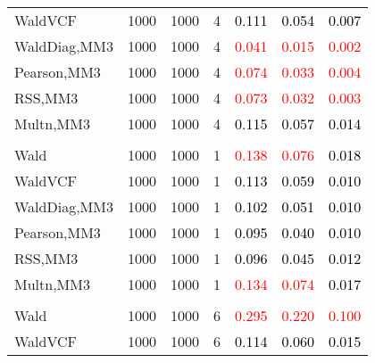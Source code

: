\documentclass[
]{article}
\begin{document}
\begin{table}[H]
{\begin{tabular}[t]{lrrrrrr}
\hspace{1em}WaldVCF & 1000 & 1000 & 4 & \textcolor{black}{0.111} & \textcolor{black}{0.054} & \textcolor{black}{0.007}\\
\hspace{1em}WaldDiag,MM3 & 1000 & 1000 & 4 & \textcolor{red}{0.041} & \textcolor{red}{0.015} & \textcolor{red}{0.002}\\
\hspace{1em}Pearson,MM3 & 1000 & 1000 & 4 & \textcolor{red}{0.074} & \textcolor{red}{0.033} & \textcolor{red}{0.004}\\
\hspace{1em}RSS,MM3 & 1000 & 1000 & 4 & \textcolor{red}{0.073} & \textcolor{red}{0.032} & \textcolor{red}{0.003}\\
\hspace{1em}Multn,MM3 & 1000 & 1000 & 4 & \textcolor{black}{0.115} & \textcolor{black}{0.057} & \textcolor{black}{0.014}\\
\addlinespace[0.3em]
\multicolumn{7}{l}{\textbf{1F 15V}}\\
\hspace{1em}Wald & 1000 & 1000 & 1 & \textcolor{red}{0.138} & \textcolor{red}{0.076} & \textcolor{black}{0.018}\\
\hspace{1em}WaldVCF & 1000 & 1000 & 1 & \textcolor{black}{0.113} & \textcolor{black}{0.059} & \textcolor{black}{0.010}\\
\hspace{1em}WaldDiag,MM3 & 1000 & 1000 & 1 & \textcolor{black}{0.102} & \textcolor{black}{0.051} & \textcolor{black}{0.010}\\
\hspace{1em}Pearson,MM3 & 1000 & 1000 & 1 & \textcolor{black}{0.095} & \textcolor{black}{0.040} & \textcolor{black}{0.010}\\
\hspace{1em}RSS,MM3 & 1000 & 1000 & 1 & \textcolor{black}{0.096} & \textcolor{black}{0.045} & \textcolor{black}{0.012}\\
\hspace{1em}Multn,MM3 & 1000 & 1000 & 1 & \textcolor{red}{0.134} & \textcolor{red}{0.074} & \textcolor{black}{0.017}\\
\addlinespace[0.3em]
\multicolumn{7}{l}{\textbf{2F 10V}}\\
\hspace{1em}Wald & 1000 & 1000 & 6 & \textcolor{red}{0.295} & \textcolor{red}{0.220} & \textcolor{red}{0.100}\\
\hspace{1em}WaldVCF & 1000 & 1000 & 6 & \textcolor{black}{0.114} & \textcolor{black}{0.060} & \textcolor{black}{0.015}\\

\end{tabular}}
\end{table}
\end{document}
